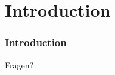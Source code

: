 \section{Introduction}

\begin{frame}
    \frametitle{Introduction}

    \begin{center}
        Fragen?
    \end{center}
\end{frame}